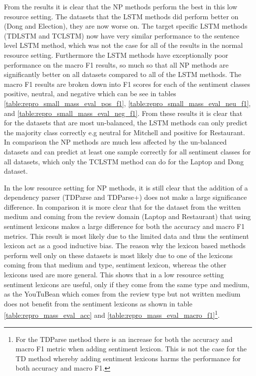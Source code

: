From the results it is clear that the NP methods perform the best in this low resource setting. The datasets that the LSTM methods did perform better on (Dong and Election), they are now worse on. The target specific LSTM methods (TDLSTM and TCLSTM) now have very similar performance to the sentence level LSTM method, which was not the case for all of the results in the normal resource setting. Furthermore the LSTM methods have exceptionally poor performance on the macro F1 results, so much so that all NP methods are significantly better on all datasets compared to all of the LSTM methods. The macro F1 results are broken down into F1 scores for each of the sentiment classes positive, neutral, and negative which can be see in tables \ref{table:repro_small_mass_eval_pos_f1}, \ref{table:repro_small_mass_eval_neu_f1}, and \ref{table:repro_small_mass_eval_neg_f1}. From these results it is clear that for the datasets that are most un-balanced, the LSTM methods can only predict the majority class correctly e.g neutral for Mitchell and positive for Restaurant. In comparison the NP methods are much less affected by the un-balanced datasets and can predict at least one sample correctly for all sentiment classes for all datasets, which only the TCLSTM method can do for the Laptop and Dong dataset. 

In the low resource setting for NP methods, it is still clear that the addition of a dependency parser (TDParse and TDParse+)  does not make a large significance difference. In comparison it is more clear that for the dataset from the written medium and coming from the review domain (Laptop and Restaurant) that using sentiment lexicons makes a large difference for both the accuracy and macro F1 metrics. This result is most likely due to the limited data and thus the sentiment lexicon act as a good inductive bias. The reason why the lexicon based methods perform well only on these datasets is most likely due to one of the lexicons coming from that medium and type, \citet{hu2004mining} sentiment lexicon, whereas the other lexicons used are more general. This shows that in a low resource setting sentiment lexicons are useful, only if they come from the same type and medium, as the YouTuBean which comes from the review type but not written medium does not benefit from the sentiment lexicons as shown in table \ref{table:repro_mass_eval_acc} and \ref{table:repro_mass_eval_macro_f1}\footnote{For the TDParse method there is an increase for both the accuracy and macro F1 metric when adding sentiment lexicon. This is not the case for the TD method whereby adding sentiment lexicons harms the performance for both accuracy and macro F1.}.

